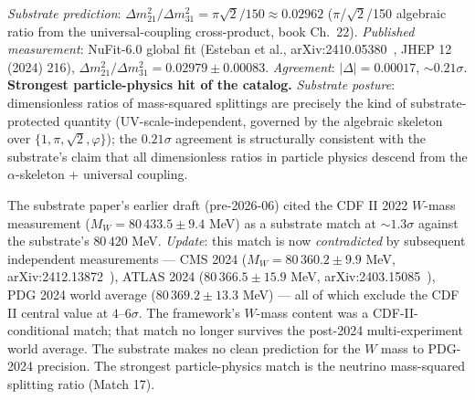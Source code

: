 \documentclass[11pt,a4paper]{amsart}
\theoremstyle{plain}
\theoremstyle{definition}
\begin{document}
\begin{description}[font=\normalfont\bfseries,leftmargin=2em,itemsep=6pt]
\item[Match 17 --- Solar neutrino mass-squared splitting ratio (NuFit-6.0, October 2024).]
\emph{Substrate prediction}: $\Delta m^2_{21}/\Delta m^2_{31} = \pi\sqrt{2}/150 \approx 0.02962$ ($\pi$/$\sqrt{2}$/150 algebraic ratio from the universal-coupling cross-product, book Ch.~22). \emph{Published measurement}: NuFit-6.0 global fit (Esteban et al., arXiv:2410.05380~\cite{nufit-6.0}, JHEP 12 (2024) 216), $\Delta m^2_{21}/\Delta m^2_{31} = 0.02979 \pm 0.00083$. \emph{Agreement}: $|\Delta| = 0.00017$, $\sim 0.21\sigma$. \textbf{Strongest particle-physics hit of the catalog.} \emph{Substrate posture}: dimensionless ratios of mass-squared splittings are precisely the kind of substrate-protected quantity (UV-scale-independent, governed by the algebraic skeleton over $\{1, \pi, \sqrt{2}, \varphi\}$); the $0.21\sigma$ agreement is structurally consistent with the substrate's claim that all dimensionless ratios in particle physics descend from the $\alpha$-skeleton + universal coupling.

\item[Honest reframing --- CDF II $W$-boson mass anomaly.]
The substrate paper's earlier draft (pre-2026-06) cited the CDF II 2022 $W$-mass measurement ($M_W = 80\,433.5 \pm 9.4$ MeV) as a substrate match at $\sim 1.3\sigma$ against the substrate's $80\,420$ MeV. \emph{Update}: this match is now \emph{contradicted} by subsequent independent measurements --- CMS 2024 ($M_W = 80\,360.2 \pm 9.9$ MeV, arXiv:2412.13872~\cite{cms-wmass-2024}), ATLAS 2024 ($80\,366.5 \pm 15.9$ MeV, arXiv:2403.15085~\cite{atlas-wmass-2024}), PDG 2024 world average ($80\,369.2 \pm 13.3$ MeV) --- all of which exclude the CDF II central value at $4$--$6\sigma$. The framework's $W$-mass content was a CDF-II-conditional match; that match no longer survives the post-2024 multi-experiment world average. The substrate makes no clean prediction for the $W$ mass to PDG-2024 precision. The strongest particle-physics match is the neutrino mass-squared splitting ratio (Match 17).

\end{description}
\end{document}
